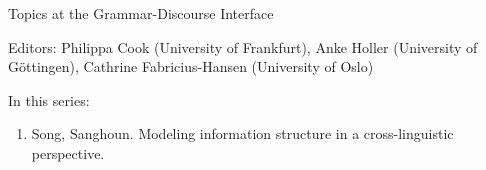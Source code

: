 {\large  Topics at the Grammar-Discourse Interface}

\bigskip

Editors: Philippa Cook (University of Frankfurt),
Anke Holler (University of Göttingen),
Cathrine Fabricius-Hansen (University of Oslo)

\bigskip

In this series:

\begin{enumerate}
\item Song, Sanghoun. Modeling information structure in a cross-linguistic perspective.
\end{enumerate}

 
